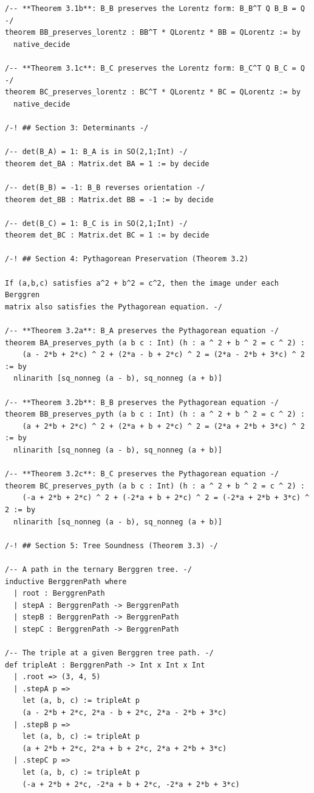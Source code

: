 \documentclass[11pt,openright,twoside]{book}
\theoremstyle{definition}
\begin{document}
\begin{lstlisting}[style=lean]
/-- **Theorem 3.1b**: B_B preserves the Lorentz form: B_B^T Q B_B = Q -/
theorem BB_preserves_lorentz : BB^T * QLorentz * BB = QLorentz := by
  native_decide

/-- **Theorem 3.1c**: B_C preserves the Lorentz form: B_C^T Q B_C = Q -/
theorem BC_preserves_lorentz : BC^T * QLorentz * BC = QLorentz := by
  native_decide

/-! ## Section 3: Determinants -/

/-- det(B_A) = 1: B_A is in SO(2,1;Int) -/
theorem det_BA : Matrix.det BA = 1 := by decide

/-- det(B_B) = -1: B_B reverses orientation -/
theorem det_BB : Matrix.det BB = -1 := by decide

/-- det(B_C) = 1: B_C is in SO(2,1;Int) -/
theorem det_BC : Matrix.det BC = 1 := by decide

/-! ## Section 4: Pythagorean Preservation (Theorem 3.2)

If (a,b,c) satisfies a^2 + b^2 = c^2, then the image under each Berggren
matrix also satisfies the Pythagorean equation. -/

/-- **Theorem 3.2a**: B_A preserves the Pythagorean equation -/
theorem BA_preserves_pyth (a b c : Int) (h : a ^ 2 + b ^ 2 = c ^ 2) :
    (a - 2*b + 2*c) ^ 2 + (2*a - b + 2*c) ^ 2 = (2*a - 2*b + 3*c) ^ 2 := by
  nlinarith [sq_nonneg (a - b), sq_nonneg (a + b)]

/-- **Theorem 3.2b**: B_B preserves the Pythagorean equation -/
theorem BB_preserves_pyth (a b c : Int) (h : a ^ 2 + b ^ 2 = c ^ 2) :
    (a + 2*b + 2*c) ^ 2 + (2*a + b + 2*c) ^ 2 = (2*a + 2*b + 3*c) ^ 2 := by
  nlinarith [sq_nonneg (a - b), sq_nonneg (a + b)]

/-- **Theorem 3.2c**: B_C preserves the Pythagorean equation -/
theorem BC_preserves_pyth (a b c : Int) (h : a ^ 2 + b ^ 2 = c ^ 2) :
    (-a + 2*b + 2*c) ^ 2 + (-2*a + b + 2*c) ^ 2 = (-2*a + 2*b + 3*c) ^ 2 := by
  nlinarith [sq_nonneg (a - b), sq_nonneg (a + b)]

/-! ## Section 5: Tree Soundness (Theorem 3.3) -/

/-- A path in the ternary Berggren tree. -/
inductive BerggrenPath where
  | root : BerggrenPath
  | stepA : BerggrenPath -> BerggrenPath
  | stepB : BerggrenPath -> BerggrenPath
  | stepC : BerggrenPath -> BerggrenPath

/-- The triple at a given Berggren tree path. -/
def tripleAt : BerggrenPath -> Int x Int x Int
  | .root => (3, 4, 5)
  | .stepA p =>
    let (a, b, c) := tripleAt p
    (a - 2*b + 2*c, 2*a - b + 2*c, 2*a - 2*b + 3*c)
  | .stepB p =>
    let (a, b, c) := tripleAt p
    (a + 2*b + 2*c, 2*a + b + 2*c, 2*a + 2*b + 3*c)
  | .stepC p =>
    let (a, b, c) := tripleAt p
    (-a + 2*b + 2*c, -2*a + b + 2*c, -2*a + 2*b + 3*c)


\end{lstlisting}
\end{document}
